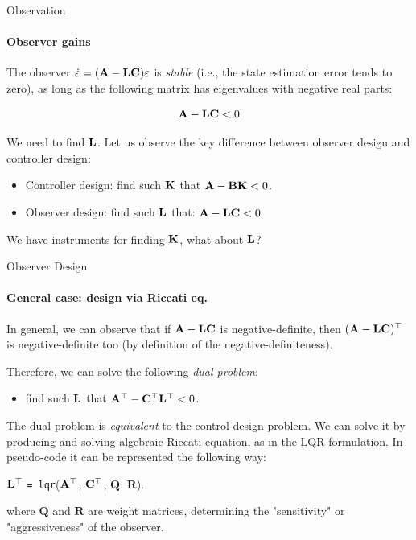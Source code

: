 \documentclass{beamer}
\begin{document}
\begin{frame}{Observation}
\framesubtitle{Observer gains}
\begin{flushleft}

The observer $\dot {\varepsilon}= 
(\mathbf{A} - \mathbf{L} \mathbf{C}) \varepsilon$ is \emph{stable} (i.e., the state estimation error tends to zero), as long as the following matrix has eigenvalues with negative real parts:

\[
\mathbf{A} - 
\mathbf{L} \mathbf{C} < 0
\]

We need to find $\mathbf{L}$. Let us observe the key difference between observer design and controller design:

\bigskip

\begin{itemize}
    \item Controller design: find such $\mathbf{K}$ that $\mathbf{A} - \mathbf{B} \mathbf{K} < 0$.
    \item Observer design: find such $\mathbf{L}$ that: $\mathbf{A} - \mathbf{L} \mathbf{C} < 0$
\end{itemize}

\bigskip

We have instruments for finding $\mathbf{K}$, what about $\mathbf{L}$?

\end{flushleft}
\end{frame}


\begin{frame}{Observer Design}
\framesubtitle{General case: design via Riccati eq.}
\begin{flushleft}

In general, we can observe that if $\mathbf{A} - \mathbf{L} \mathbf{C}$ is negative-definite, then $(\mathbf{A} - 
\mathbf{L} \mathbf{C})^{\top}$ is negative-definite too (by definition of the negative-definiteness). 

\bigskip

Therefore, we can solve the following \emph{dual problem}:

\begin{itemize}
    \item find such $\mathbf{L}$ that $\mathbf{A}^{\top} - 
\mathbf{C}^{\top} \mathbf{L}^{\top} < 0$.
\end{itemize}

\bigskip

The dual problem is \emph{equivalent} to the control design problem. We can solve it by producing and solving algebraic Riccati equation, as in the LQR formulation. In pseudo-code it can be represented the following way:

\bigskip

$\mathbf{L}^{\top}$ \texttt{= lqr}($\mathbf{A}^{\top}$, $\mathbf{C}^{\top}$, $\mathbf Q$, $\mathbf R$).

where $\mathbf Q$ and $\mathbf R$ are weight  matrices, determining the "sensitivity" or "aggressiveness" of the observer.


\end{flushleft}
\end{frame}
\end{document}
